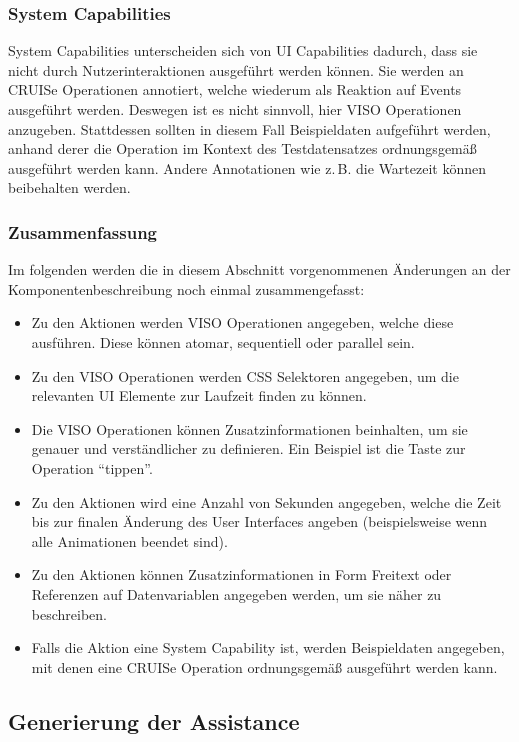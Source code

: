 \documentclass[
	headsepline,
	footsepline,
	fontsize=12pt,
	bibliography=totoc
]{scrbook}
\begin{document}
\subsubsection{System Capabilities}

System Capabilities unterscheiden sich von UI Capabilities dadurch, dass sie nicht durch Nutzerinteraktionen ausgeführt werden können. Sie werden an CRUISe Operationen annotiert, welche wiederum als Reaktion auf Events ausgeführt werden. Deswegen ist es nicht sinnvoll, hier VISO Operationen anzugeben. Stattdessen sollten in diesem Fall Beispieldaten aufgeführt werden, anhand derer die Operation im Kontext des Testdatensatzes ordnungsgemäß ausgeführt werden kann. Andere Annotationen wie z.\,B. die Wartezeit können beibehalten werden.

\subsubsection{Zusammenfassung}

Im folgenden werden die in diesem Abschnitt vorgenommenen Änderungen an der Komponentenbeschreibung noch einmal zusammengefasst:
\begin{itemize}
	\item Zu den Aktionen werden VISO Operationen angegeben, welche diese ausführen. Diese können atomar, sequentiell oder parallel sein.
	\item Zu den VISO Operationen werden CSS Selektoren angegeben, um die relevanten UI Elemente zur Laufzeit finden zu können.
	\item Die VISO Operationen können Zusatzinformationen beinhalten, um sie genauer und verständlicher zu definieren. Ein Beispiel ist die Taste zur Operation \enquote{tippen}.
	\item Zu den Aktionen wird eine Anzahl von Sekunden angegeben, welche die Zeit bis zur finalen Änderung des User Interfaces angeben (beispielsweise wenn alle Animationen beendet sind).
	\item Zu den Aktionen können Zusatzinformationen in Form Freitext oder Referenzen auf Datenvariablen angegeben werden, um sie näher zu beschreiben.
	\item Falls die Aktion eine System Capability ist, werden Beispieldaten angegeben, mit denen eine CRUISe Operation ordnungsgemäß ausgeführt werden kann.
\end{itemize}

\subsection{Generierung der Assistance}
\label{section:konzeption:bedienung:generierung}
\end{document}
